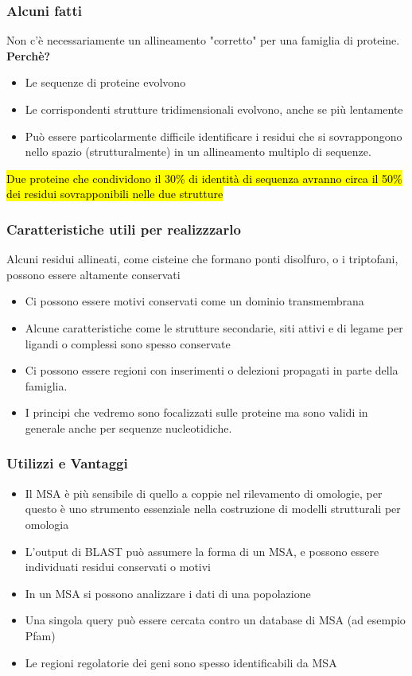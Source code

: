 \documentclass{article}
\begin{document}
\subsubsection{Alcuni fatti}
Non c'è necessariamente un allineamento "corretto" per una famiglia di proteine.\\
\textbf{Perchè?}
    \begin{itemize}
        \item Le sequenze di proteine evolvono
        \item Le corrispondenti strutture tridimensionali evolvono, anche se più lentamente
        \item Può essere particolarmente difficile identificare i residui che si sovrappongono nello spazio (strutturalmente) in un allineamento multiplo di sequenze.
    \end{itemize}
\hl{Due proteine che condividono il 30\% di identità di sequenza avranno circa il 50\% dei residui sovrapponibili nelle due strutture}
\subsubsection{Caratteristiche utili per realizzzarlo}
Alcuni residui allineati, come cisteine che formano ponti disolfuro, o i triptofani, possono essere altamente conservati
    \begin{itemize}
        \item Ci possono essere motivi conservati come un dominio transmembrana
        \item Alcune caratteristiche come le strutture secondarie, siti attivi e di legame per ligandi o complessi sono spesso conservate
        \item Ci possono essere regioni con inserimenti o delezioni propagati in parte della famiglia.
        \item I principi che vedremo sono focalizzati sulle proteine ma sono validi in generale anche per sequenze nucleotidiche.
    \end{itemize}
\subsubsection{Utilizzi e Vantaggi}
    \begin{itemize}
        \item Il MSA è più sensibile di quello a coppie nel rilevamento di omologie, per questo è uno strumento essenziale nella costruzione di modelli strutturali per omologia
        \item L'output di BLAST può assumere la forma di un MSA, e possono essere individuati residui conservati o motivi
        \item In un MSA si possono analizzare i dati di una popolazione
        \item Una singola query può essere cercata contro un database di MSA (ad esempio Pfam)
        \item Le regioni regolatorie dei geni sono spesso identificabili da MSA
    \end{itemize}
\end{document}
